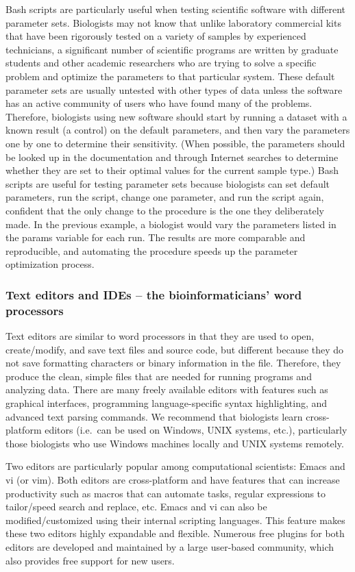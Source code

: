\documentclass[ChapterTOCs,krantz2]{krantz} %
\begin{document}
Bash scripts are particularly useful when testing scientific software with
different parameter sets.  Biologists may not know that
unlike laboratory commercial kits that have been rigorously tested on a
variety of samples by experienced technicians, a significant
number of scientific programs are written by graduate students and other
academic researchers who are trying to solve a specific problem and optimize
the parameters to that particular system.  These default parameter sets are
usually untested with other types of data unless the software
has an active community of users who
have found many of the problems.  Therefore, biologists using new
software should start by running a dataset with a known result (a control) on
the default parameters, and then vary the parameters one by one to determine
their sensitivity.  (When possible, the parameters should be looked up in the
documentation and through Internet searches to determine whether they are set
to their optimal values for the current sample type.)  Bash scripts are useful
for testing parameter sets because biologists can set default parameters, run
the script, change one parameter, and run the script again, confident that the
only change to the procedure is the one they deliberately made.  In the
previous example, a biologist would vary the parameters listed in the params
variable for each run.  The results are more comparable and reproducible, and
automating the procedure speeds up the parameter optimization process.

\subsubsection{Text editors and IDEs -- the bioinformaticians' word processors}

Text editors are 
similar to word processors in that they are used to open,
create/modify, and save text files and source code, but different because they
do not save formatting characters or binary information in the file.
Therefore, they produce the clean, simple files that are needed for running programs
and analyzing data.  There are many freely available editors with features such
as graphical interfaces, programming language-specific syntax
highlighting, and advanced text parsing commands. 
We recommend that biologists learn cross-platform editors
(i.e.\ can be used on Windows, UNIX systems, etc.), particularly
those biologists who use Windows machines locally and UNIX systems
remotely.

Two editors are particularly popular among computational scientists: Emacs and vi (or vim).
Both editors are cross-platform and have features that can increase productivity
such as macros that can automate tasks, regular expressions to 
tailor/speed search and replace, etc.
Emacs and vi can also be modified/customized using 
their internal scripting languages.
This feature makes these two editors highly expandable and flexible.
Numerous free plugins for both editors are developed and maintained by a
large user-based community, which also provides free support for new users.
\end{document}
